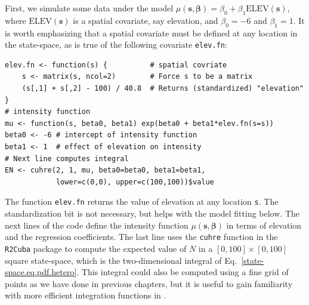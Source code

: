 First, we simulate some data under the model $\mu(\mathbf{s},
\bm{\beta}) = \beta_0 + \beta_1\mathrm{ELEV}(\mathbf{s})$, where
$\mathrm{ELEV}(\mathbf{s})$ is a spatial covariate, say
elevation, and $\beta_0=-6$ and $\beta_1=1$. It is worth emphasizing
that a spatial covariate must be defined at any location in the
state-space, as is true of the following covariate \verb+elev.fn+:
  \begin{small}
\begin{verbatim}
elev.fn <- function(s) {          # spatial covriate
    s <- matrix(s, ncol=2)        # Force s to be a matrix
    (s[,1] + s[,2] - 100) / 40.8  # Returns (standardized) "elevation"
}
# intensity function
mu <- function(s, beta0, beta1) exp(beta0 + beta1*elev.fn(s=s))
beta0 <- -6 # intercept of intensity function
beta1 <- 1  # effect of elevation on intensity
# Next line computes integral
EN <- cuhre(2, 1, mu, beta0=beta0, beta1=beta1,
            lower=c(0,0), upper=c(100,100))$value
\end{verbatim}
\end{small}
The function \texttt{elev.fn} returns the value of elevation at any
location \verb+s+. The standardization bit is not necessary,
but helps with the model fitting below. The next lines of the code define the
intensity function $\mu(\mathbf{s}, \bm{\beta})$ in terms of elevation
and the regression coefficients. The last line uses the \verb+cuhre+ function in
the {\tt R2Cuba} package \citep{hahn_etal:2011} to compute the
expected value of $N$ in a $[0,100]\times[0,100]$ square state-space, which is the
two-dimensional integral of Eq.~\ref{state-space.eq.pdf.hetero}. This
integral could also be computed using a fine grid of points as we have done in previous
chapters, but it is useful to gain familiarity with more efficient
integration functions in \R.

